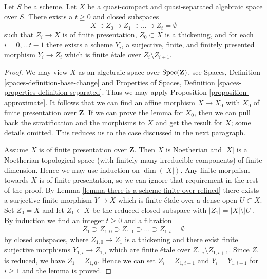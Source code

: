 \begin{lemma}
\label{lemma-there-is-a-scheme-finite-over-filtered}
Let $S$ be a scheme. Let $X$ be a quasi-compact and quasi-separated
algebraic space over $S$. There exists a $t \geq 0$ and closed
subspaces
$$
X \supset Z_0 \supset Z_1 \supset \ldots \supset Z_t = \emptyset
$$
such that $Z_i \to X$ is of finite presentation,
$Z_0 \subset X$ is a thickening, and for each $i = 0, \ldots t - 1$
there exists a scheme $Y_i$, a surjective, finite, and finitely
presented morphism $Y_i \to Z_i$ which is finite \'etale over
$Z_i \setminus Z_{i + 1}$.
\end{lemma}

\begin{proof}
We may view $X$ as an algebraic space over $\mathop{\mathrm{Spec}}(\mathbf{Z})$, see
Spaces, Definition \ref{spaces-definition-base-change} and
Properties of Spaces, Definition \ref{spaces-properties-definition-separated}.
Thus we may apply Proposition \ref{proposition-approximate}.
It follows that we can find an affine morphism $X \to X_0$
with $X_0$ of finite presentation over $\mathbf{Z}$.
If we can prove the lemma for $X_0$, then we can pull back
the stratification and the morphisms to $X$ and get the result for $X$;
some details omitted. This reduces us to the case discussed in the
next paragraph.

\medskip\noindent
Assume $X$ is of finite presentation over $\mathbf{Z}$.
Then $X$ is Noetherian and $|X|$ is a Noetherian topological
space (with finitely many irreducible components) of finite dimension.
Hence we may use induction on $\dim(|X|)$.
Any finite morphism towards $X$ is of finite presentation, so
we can ignore that requirement in the rest of the proof.
By Lemma \ref{lemma-there-is-a-scheme-finite-over-refined}
there exists a surjective finite morphism $Y \to X$ which is
finite \'etale over a dense open $U \subset X$.
Set $Z_0 = X$ and let $Z_1 \subset X$ be the reduced closed subspace
with $|Z_1| = |X| \setminus |U|$.
By induction we find an integer $t \geq 0$ and a filtration
$$
Z_1 \supset Z_{1, 0} \supset Z_{1, 1} \supset \ldots
\supset Z_{1, t} = \emptyset
$$
by closed subspaces, where $Z_{1, 0} \to Z_1$ is a thickening
and there exist finite surjective morphisms $Y_{1, i} \to Z_{1, i}$
which are finite \'etale over $Z_{1, i} \setminus Z_{1, i + 1}$.
Since $Z_1$ is reduced, we have $Z_1 = Z_{1, 0}$.
Hence we can set $Z_i = Z_{1, i - 1}$ and $Y_i = Y_{1, i - 1}$
for $i \geq 1$ and the lemma is proved.
\end{proof}











